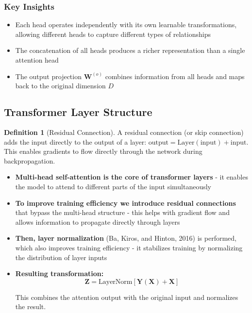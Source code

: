 \documentclass[11pt,a4paper]{article}
\theoremstyle{definition}
\newtheorem{definition}{Definition}[section]
\theoremstyle{plain}
\theoremstyle{remark}
\begin{document}
\subsubsection{Key Insights}

\begin{itemize}
    \item Each head operates independently with its own learnable transformations, allowing different heads to capture different types of relationships
    \item The concatenation of all heads produces a richer representation than a single attention head
    \item The output projection $\mathbf{W}^{(o)}$ combines information from all heads and maps back to the original dimension $D$
\end{itemize}

\subsection{Transformer Layer Structure}

\begin{definition}[Residual Connection]
A residual connection (or skip connection) adds the input directly to the output of a layer: $\text{output} = \text{Layer}(\text{input}) + \text{input}$. This enables gradients to flow directly through the network during backpropagation.
\end{definition}

\begin{itemize}
    \item \textbf{Multi-head self-attention is the core of transformer layers} - it enables the model to attend to different parts of the input simultaneously
    
    \item \textbf{To improve training efficiency we introduce residual connections} that bypass the multi-head structure - this helps with gradient flow and allows information to propagate directly through layers
    
    \item \textbf{Then, layer normalization} (Ba, Kiros, and Hinton, 2016) is performed, which also improves training efficiency - it stabilizes training by normalizing the distribution of layer inputs
    
    \item \textbf{Resulting transformation:}
    \[
    \mathbf{Z} = \text{LayerNorm}[\mathbf{Y}(\mathbf{X}) + \mathbf{X}]
    \]
    
    This combines the attention output with the original input and normalizes the result.
\end{itemize}
\end{document}
